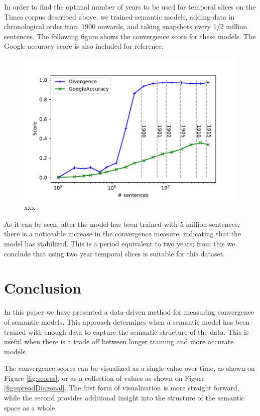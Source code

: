 \documentclass{article} %
\begin{document}
In order to find the optimal number of years to be used for temporal slices on the Times corpus described above, we trained semantic models, adding data in chronological order from 1900 onwards, and taking snapshots every 1/2 million sentences. The following figure shows the convergence score for these models. The Google accuracy score is also included for reference.

\begin{figure}
 \includegraphics[width=\textwidth]{diachronicSlices.pdf} 
 \caption{xxx}
 \label{fig:diachronic}
\end{figure}

As it can be seen, after the model has been trained with 5 million sentences, there is a noticeable increase in the convergence measure, indicating that the model has stabilized. This is a period equivalent to two years; from this we conclude that using two year temporal slices is suitable for this dataset.

\section{Conclusion}
\label{sec:conclusion}
In this paper we have presented a data-driven method for measuring convergence of semantic models. This approach determines when a semantic model has been trained with enough data to capture the semantic structure of the data. This is useful when there is a trade off between longer training and more accurate models.

The convergence scores can be visualized as a single value over time, as shown on Figure \ref{fig:scores}, or as a collection of values as shown on Figure \ref{fig:spreadDiagonal}. The first form of visualization is more straight forward, while the second provides additional insight into the structure of the semantic space as a whole.
\end{document}
